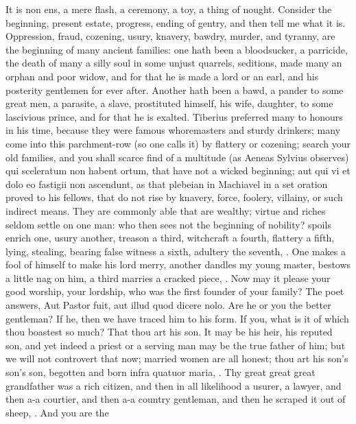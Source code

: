 {It is non ens, a mere flash, a ceremony, a toy, a thing of
nought. Consider the beginning, present estate, progress, ending of
gentry, and then tell me what it is. Oppression, fraud, cozening,
usury, knavery, bawdry, murder, and tyranny, are the beginning of many
ancient families: one hath been a bloodsucker, a parricide, the
death of many a silly soul in some unjust quarrels, seditions, made
many an orphan and poor widow, and for that he is made a lord or an
earl, and his posterity gentlemen for ever after. Another hath been a
bawd, a pander to some great men, a parasite, a slave,
prostituted himself, his wife, daughter, to some lascivious
prince, and for that he is exalted. Tiberius preferred many to honours
in his time, because they were famous whoremasters and sturdy drinkers;
many come into this parchment-row (so one calls it) by flattery
or cozening; search your old families, and you shall scarce find of a
multitude (as Aeneas Sylvius observes) qui sceleratum non habent ortum,
that have not a wicked beginning; aut qui vi et dolo eo fastigii non
ascendunt, as that plebeian in Machiavel in a set oration proved
to his fellows, that do not rise by knavery, force, foolery, villainy,
or such indirect means. They are commonly able that are wealthy; virtue
and riches seldom settle on one man: who then sees not the beginning of
nobility? spoils enrich one, usury another, treason a third, witchcraft
a fourth, flattery a fifth, lying, stealing, bearing false witness a
sixth, adultery the seventh, \etc{}. One makes a fool of himself to make
his lord merry, another dandles my young master, bestows a little nag
on him, a third marries a cracked piece, \etc{}. Now may it please your
good worship, your lordship, who was the first founder of your family?
The poet answers, Aut Pastor fuit, aut illud quod dicere nolo.
Are he or you the better gentleman? If he, then we have traced him to
his form. If you, what is it of which thou boastest so much? That thou
art his son. It may be his heir, his reputed son, and yet indeed a
priest or a serving man may be the true father of him; but we will not
controvert that now; married women are all honest; thou art his son's
son's son, begotten and born infra quatuor maria, \etc{}. Thy great great
great grandfather was a rich citizen, and then in all likelihood a
usurer, a lawyer, and then a-a courtier, and then a-a country
gentleman, and then he scraped it out of sheep, \etc{}. And you are the
}

